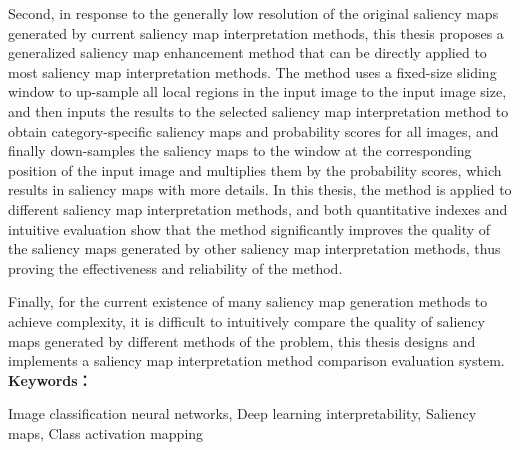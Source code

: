Second, in response to the generally low resolution of the original saliency maps generated by current saliency map interpretation methods, this thesis proposes a generalized saliency map enhancement method that can be directly applied to most saliency map interpretation methods. The method uses a fixed-size sliding window to up-sample all local regions in the input image to the input image size, and then inputs the results to the selected saliency map interpretation method to obtain category-specific saliency maps and probability scores for all images, and finally down-samples the saliency maps to the window at the corresponding position of the input image and multiplies them by the probability scores, which results in saliency maps with more details. In this thesis, the method is applied to different saliency map interpretation methods, and both quantitative indexes and intuitive evaluation show that the method significantly improves the quality of the saliency maps generated by other saliency map interpretation methods, thus proving the effectiveness and reliability of the method.

Finally, for the current existence of many saliency map generation methods to achieve complexity, it is difficult to intuitively compare the quality of saliency maps generated by different methods of the problem, this thesis designs and implements a saliency map interpretation method comparison evaluation system.
\\

\noindent\textbf{Keywords：} 
\begin{minipage}[t]{0.85\linewidth}
	Image classification neural networks, Deep learning interpretability, Saliency maps, Class activation mapping
\end{minipage}

\clearpage
